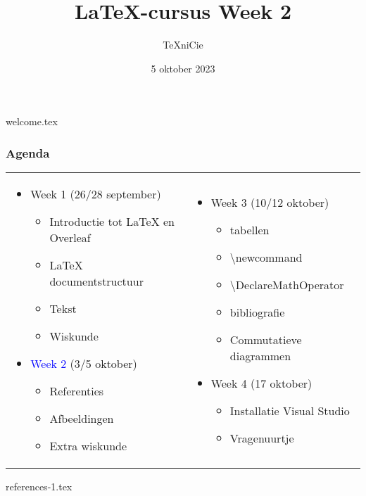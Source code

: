 \documentclass[allauthors,dutch]{../../cursuspresentatie}
\title{\LaTeX{}-cursus Week 2}
\author{\TeX niCie}
\date{5 oktober 2023}
\begin{document}
{welcome.tex}
\begin{frame}
	\frametitle{Agenda}

	\begin{tabular}{p{6cm} p{7cm}}
	\begin{itemize}
		\item Week 1 (26/28 september)
	\begin{itemize}[label=\textbullet]
		\item Introductie tot LaTeX en Overleaf
		\item LaTeX documentstructuur
		\item Tekst
		\item Wiskunde
	\end{itemize}
		\item \textcolor{blue}{Week 2} (3/5 oktober)
	\begin{itemize}[label=\textbullet]
		\item Referenties
		\item Afbeeldingen
		\item Extra wiskunde
	\end{itemize}
	\end{itemize}
		&
	\begin{itemize}
		\item Week 3 (10/12 oktober)
			\begin{itemize}[label=\textbullet]
			\item tabellen
			\item \textbackslash newcommand
			\item \textbackslash DeclareMathOperator
			\item bibliografie
    			\item Commutatieve diagrammen
		\end{itemize}
	\item Week 4 (17 oktober)
		\begin{itemize}
			\item Installatie Visual Studio
			\item Vragenuurtje
		\end{itemize}
	\end{itemize}
	\end{tabular}
\end{frame}
{references-1.tex}
\end{document}
